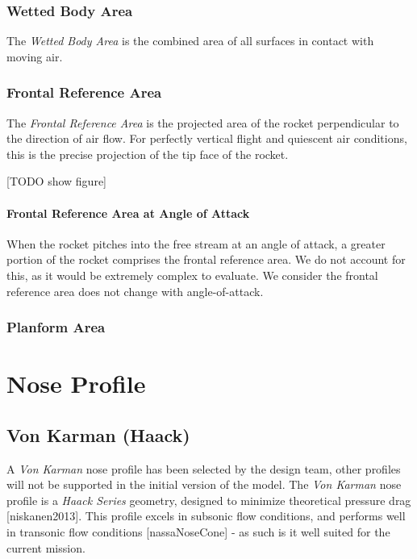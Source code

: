\documentclass[]{book}
\let\oldparagraph\paragraph
\renewcommand{\paragraph}[1]{\oldparagraph{#1}\mbox{}}
\begin{document}
\subsubsection{Wetted Body Area}\label{wetted-body-area}

The \emph{Wetted Body Area} is the combined area of all surfaces in
contact with moving air.

\subsubsection{Frontal Reference Area}\label{frontal-reference-area}

The \emph{Frontal Reference Area} is the projected area of the rocket
perpendicular to the direction of air flow. For perfectly vertical
flight and quiescent air conditions, this is the precise projection of
the tip face of the rocket.

{[}TODO show figure{]}

\paragraph{Frontal Reference Area at Angle of
Attack}\label{frontal-reference-area-at-angle-of-attack}

When the rocket pitches into the free stream at an angle of attack, a
greater portion of the rocket comprises the frontal reference area. We
do not account for this, as it would be extremely complex to evaluate.
We consider the frontal reference area does not change with
angle-of-attack.

\subsubsection{Planform Area}\label{planform-area}

\section{Nose Profile}\label{nose-profile}

\subsection{Von Karman (Haack)}\label{von-karman-haack}

A \emph{Von Karman} nose profile has been selected by the design team,
other profiles will not be supported in the initial version of the
model. The \emph{Von Karman} nose profile is a \emph{Haack Series}
geometry, designed to minimize theoretical pressure drag
{[}niskanen2013{]}. This profile excels in subsonic flow conditions, and
performs well in transonic flow conditions {[}nassaNoseCone{]} - as such
is it well suited for the current mission.
\end{document}

